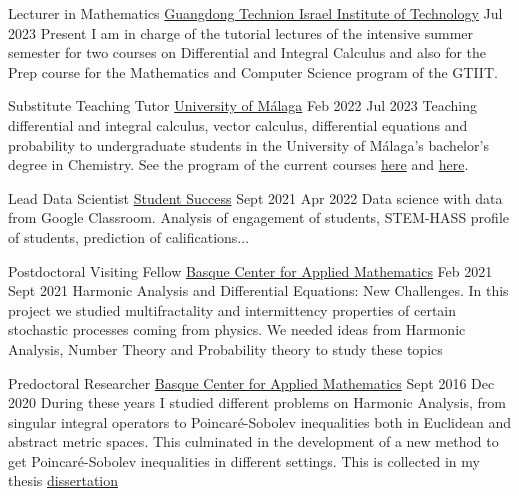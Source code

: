 \nopagebreak
\begin{employment}
		{Lecturer in Mathematics}
		{\href{https://www.gtiit.edu.cn/en/}{Guangdong Technion Israel Institute of Technology}}
		{Jul 2023}
		{Present}
		{I am in charge of the tutorial lectures of the intensive summer semester for two courses on Differential and Integral Calculus and also for the Prep course for the Mathematics and Computer Science program of the GTIIT.}
\end{employment}

\begin{employment}
    {Substitute Teaching Tutor}
    {\href{https://www.uma.es/}{University of Málaga}}
    {Feb 2022}
    {Jul 2023}
    {Teaching differential and integral calculus, vector calculus, differential equations and probability to undergraduate students in the University of Málaga's bachelor's degree in Chemistry. See the program of the current courses \href{https://oas.sci.uma.es:8443/ht/2022/ProgramasAsignaturas_Titulacion_5004_AsigUMA_51634.pdf}{here} and \href{https://oas.sci.uma.es:8443/ht/2022/ProgramasAsignaturas_Titulacion_5004_AsigUMA_51639.pdf}{here}.}
\end{employment}
\begin{employment}
    {Lead Data Scientist}
    {\href{https://studentsuccess.app/es/}{Student Success}}
    {Sept 2021}
    {Apr 2022}
    {Data science with data from Google Classroom. Analysis of  engagement of students, STEM-HASS profile of students, prediction of  califications...}
\end{employment}

\begin{employment}
    {Postdoctoral Visiting Fellow}
    { \href{http://www.bcamath.org/es/}{Basque Center for Applied Mathematics}}
    {Feb 2021}
    {Sept 2021}
    {Harmonic Analysis and Differential Equations: New Challenges. In this project we studied multifractality and intermittency properties of certain stochastic processes coming from physics. We needed ideas from Harmonic Analysis, Number Theory and Probability theory to study these topics}
\end{employment}

\begin{firstemployment}
    {Predoctoral Researcher}
    { \href{http://www.bcamath.org/es/}{Basque Center for Applied Mathematics}}
    {Sept 2016}
    {Dec 2020}
    {During these years I studied different problems on Harmonic Analysis, from singular integral operators to Poincaré-Sobolev inequalities both in Euclidean and abstract metric spaces. This culminated in the development of a new method to get Poincaré-Sobolev inequalities in different settings. This is collected in my thesis \href{https://bird.bcamath.org/handle/20.500.11824/1206}{dissertation}}
\end{firstemployment}